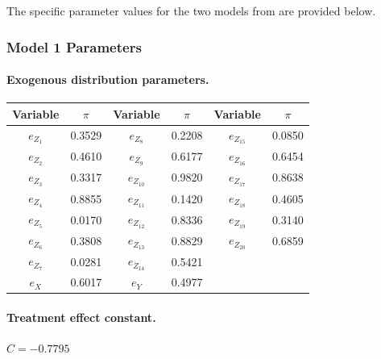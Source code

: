\documentclass[accepted]{uai2026} %
\theoremstyle{plain}
\theoremstyle{definition}
\theoremstyle{remark}
\begin{document}
The specific parameter values for the two models from \citet{li2022probabilities} are provided below.

\subsubsection{Model 1 Parameters}

\paragraph{Exogenous distribution parameters.}
\begin{table}[h]
\centering
\begin{tabular}{cc|cc|cc}
\toprule
Variable & $\pi$ & Variable & $\pi$ & Variable & $\pi$ \\
\midrule
$e_{Z_1}$ & 0.3529 & $e_{Z_8}$ & 0.2208 & $e_{Z_{15}}$ & 0.0850 \\
$e_{Z_2}$ & 0.4610 & $e_{Z_9}$ & 0.6177 & $e_{Z_{16}}$ & 0.6454 \\
$e_{Z_3}$ & 0.3317 & $e_{Z_{10}}$ & 0.9820 & $e_{Z_{17}}$ & 0.8638 \\
$e_{Z_4}$ & 0.8855 & $e_{Z_{11}}$ & 0.1420 & $e_{Z_{18}}$ & 0.4605 \\
$e_{Z_5}$ & 0.0170 & $e_{Z_{12}}$ & 0.8336 & $e_{Z_{19}}$ & 0.3140 \\
$e_{Z_6}$ & 0.3808 & $e_{Z_{13}}$ & 0.8829 & $e_{Z_{20}}$ & 0.6859 \\
$e_{Z_7}$ & 0.0281 & $e_{Z_{14}}$ & 0.5421 & & \\
\midrule
$e_X$ & 0.6017 & $e_Y$ & 0.4977 & & \\
\bottomrule
\end{tabular}
\end{table}

\paragraph{Treatment effect constant.} $C = -0.7795$
\end{document}
